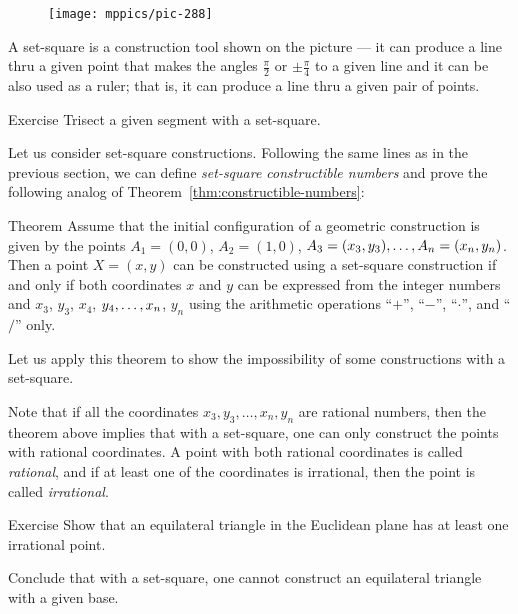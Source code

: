 {
\begin{wrapfigure}[5]{r}{26mm}
\vskip-8mm
\centering
\texttt{[image: mppics/pic-288]}
\end{wrapfigure}

A set-square is a construction tool shown on the picture ---
it can produce a line thru a given point
that makes the angles
$\tfrac\pi2$ or $\pm\tfrac\pi4$ 
to a given line and it can be also used as a ruler;
that is, it can produce a line thru a given pair of points.

\begin{thm}{Exercise}\label{ex:trisect-set-square}
Trisect a given segment with a set-square.
\end{thm}


Let us consider set-square constructions.
Following the same lines as in the previous section, we can define {}\emph{set-square constructible numbers}
and prove the following analog of Theorem~\ref{thm:constructible-numbers}:

}

\begin{thm}{Theorem}
Assume that the initial configuration of a geometric construction is given by the points $A_1=(0,0)$, $A_2=(1,0)$, $A_3\z=(x_3,y_3),\z\dots,A_n=(x_n,y_n)$.
Then a point $X=(x,y)$ can be constructed using a set-square construction
if and only if both coordinates $x$ and $y$ can be expressed from the integer numbers and $x_3$, $y_3$, $x_4$, $y_4,\z\dots,x_n$, $y_n$ using the arithmetic operations ``$+$'', ``$-$'', ``$\cdot$'', and ``$/$'' only. 
\end{thm}
 
Let us apply this theorem to show the impossibility of some constructions with a set-square.

Note that if all the coordinates $x_3,y_3,\dots,x_n,y_n$ are rational numbers, then the theorem above implies that with a set-square, one can only construct the points with rational coordinates.
A point with both rational coordinates is called \emph{rational},
and if at least one of the coordinates is irrational, then the point is called \emph{irrational}.

\begin{thm}{Exercise}\label{ex:equilateral triangle}
Show that an equilateral triangle in the Euclidean plane has at least one irrational point.

Conclude that with a set-square, one cannot construct an equilateral triangle with a given base.
\end{thm}

